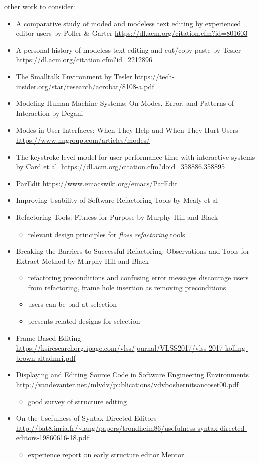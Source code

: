 \documentclass[runningheads]{llncs}
\begin{document}
other work to consider:
\begin{itemize}
\item A comparative study of moded and modeless text editing by experienced editor users by Poller \& Garter \url{https://dl.acm.org/citation.cfm?id=801603}
\item A personal history of modeless text editing and cut/copy-paste by Tesler \url{https://dl.acm.org/citation.cfm?id=2212896}
\item The Smalltalk Environment by Tesler \url{https://tech-insider.org/star/research/acrobat/8108-a.pdf}
\item Modeling Human-Machine Systems: On Modes, Error, and Patterns of Interaction by Degani %
\item Modes in User Interfaces: When They Help and When They Hurt Users \url{https://www.nngroup.com/articles/modes/}
\item The keystroke-level model for user performance time with interactive systems by Card et al. \url{https://dl.acm.org/citation.cfm?doid=358886.358895}
\item ParEdit \url{https://www.emacswiki.org/emacs/ParEdit}
\item Improving Usability of Software Refactoring Tools by Mealy et al
\item Refactoring Tools: Fitness for Purpose by Murphy-Hill and Black
	\begin{itemize}
		\item relevant design principles for \emph{floss refactoring} tools
	\end{itemize}
\item Breaking the Barriers to Successful Refactoring: Observations and Tools for Extract Method by Murphy-Hill and Black
	\begin{itemize}
		\item refactoring preconditions and confusing error messages discourage users from refactoring, frame hole insertion as removing preconditions
		\item users can be bad at selection
		\item presents related designs for selection
	\end{itemize}
\item Frame-Based Editing \url{https://ksiresearchorg.ipage.com/vlss/journal/VLSS2017/vlss-2017-kolling-brown-altadmri.pdf}
\item Displaying and Editing Source Code in Software Engineering Environments \url{http://vandevanter.net/mlvdv/publications/vdvboshernitsancoset00.pdf}
	\begin{itemize}
		\item good survey of structure editing
	\end{itemize}
\item On the Usefulness of Syntax Directed Editors \url{http://bat8.inria.fr/~lang/papers/trondheim86/usefulness-syntax-directed-editors-19860616-18.pdf}
	\begin{itemize}
		\item experience report on early structure editor Mentor
	\end{itemize}
\end{itemize}
\end{document}

